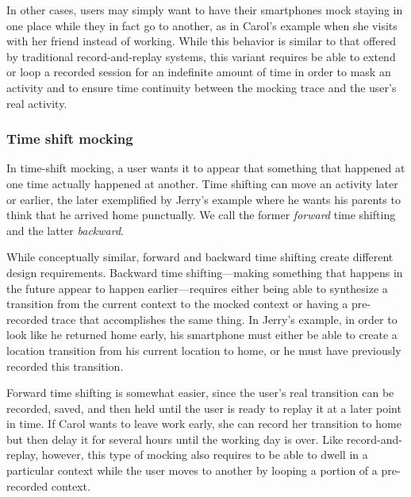 In other cases, \PocketMocker{} users may simply want to have their smartphones
mock staying in one place while they in fact go to another, as in
Carol's example when she visits with her friend instead of working. While this
behavior is similar to that offered by traditional record-and-replay systems,
this variant requires \PocketMocker{} be able to extend or loop a recorded
session for an indefinite amount of time in order to mask an activity and to
ensure time continuity between the mocking trace and the user's real activity.

\subsubsection{Time shift mocking}

In time-shift mocking, a user wants it to appear that something that happened
at one time actually happened at another. Time shifting can move an activity
later or earlier, the later exemplified by Jerry's example where he wants his
parents to think that he arrived home punctually. We call the former
\textit{forward} time shifting and the latter \textit{backward}.

While conceptually similar, forward and backward time shifting create
different design requirements. Backward time shifting---making something that
happens in the future appear to happen earlier---requires either being able
to synthesize a transition from the current context to the mocked context or
having a pre-recorded trace that accomplishes the same thing. In Jerry's
example, in order to look like he returned home early, his smartphone must
either be able to create a location transition from his current location to
home, or he must have previously recorded this transition.

Forward time shifting is somewhat easier, since the user's real transition can
be recorded, saved, and then held until the user is ready to replay it at a
later point in time. If Carol wants to leave work early, she can record her
transition to home but then delay it for several hours until the working day
is over. Like record-and-replay, however, this type of mocking also requires
\PocketMocker{} to be able to dwell in a particular context while the user
moves to another by looping a portion of a pre-recorded context.
